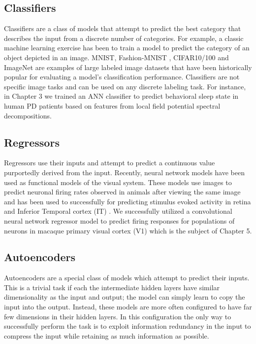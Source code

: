 \documentclass{templates/ucdenverthesis}
\begin{document}
\hypertarget{sec:classifiers}{%
\subsection{Classifiers}\label{sec:classifiers}}

Classifiers are a class of models that attempt to predict the best category that describes the input from a discrete number of categories. For example, a classic machine learning exercise has been to train a model to predict the category of an object depicted in an image. MNIST, Fashion-MNIST \autocite{Xiao:2017wj}, CIFAR10/100 \autocite{Krizhevsky:2009tr} and ImageNet are examples of large labeled image datasets that have been historically popular for evaluating a model's classification performance. Classifiers are not specific image tasks and can be used on any discrete labeling task. For instance, in Chapter 3 we trained an ANN classifier to predict behavioral sleep state in human PD patients based on features from local field potential spectral decompositions.

\hypertarget{sec:regressors}{%
\subsection{Regressors}\label{sec:regressors}}

Regressors use their inputs and attempt to predict a continuous value purportedly derived from the input. Recently, neural network models have been used as functional models of the visual system. These models use images to predict neuronal firing rates observed in animals after viewing the same image and has been used to successfully for predicting stimulus evoked activity in retina \autocite{NIPS2016_6388} and Inferior Temporal cortex (IT) \autocite{Yamins:2014gi}. We successfully utilized a convolutional neural network regressor model to predict firing responses for populations of neurons in macaque primary visual cortex (V1) which is the subject of Chapter 5.

\hypertarget{sec:autoencoders}{%
\subsection{Autoencoders}\label{sec:autoencoders}}

Autoencoders are a special class of models which attempt to predict their inputs. This is a trivial task if each the intermediate hidden layers have similar dimensionality as the input and output; the model can simply learn to copy the input into the output. Instead, these models are more often configured to have far few dimensions in their hidden layers. In this configuration the only way to successfully perform the task is to exploit information redundancy in the input to compress the input while retaining as much information as possible.
\end{document}
